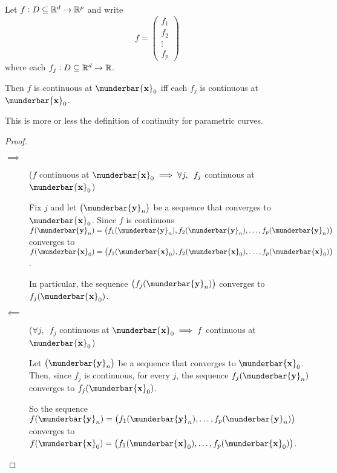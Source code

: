 \documentclass[14pt]{extarticle}
\renewcommand{\vec}[1]{\munderbar{\mathbf{#1}}}
\begin{document}
\begin{proposition}
    Let $f: D \subseteq \mathbb{R}^d \to \mathbb{R}^p$ and write
    \begin{equation}
        f = \begin{pmatrix}
            f_1    \\
            f_2    \\
            \vdots \\
            f_p
        \end{pmatrix}
    \end{equation}
    where each $f_j : D \subseteq \mathbb{R}^d \to \mathbb{R}$.

    Then $f$ is continuous at $\vec{x}_0$ iff each $f_j$ is continuous at $\vec{x}_0$.
\end{proposition}

\begin{remark}
    This is more or less the definition of continuity for parametric curves.
\end{remark}

\begin{proof}
    \skiplineafterproof
    \begin{description}
        \item[$\implies$] ($f$ continuous at $\vec{x}_0 \implies \forall j, \enspace f_j$ continuous at $\vec{x}_0$)

            Fix $j$ and let $\left(\vec{y}_n\right)$ be a sequence that converges to $\vec{x}_0$.
            Since $f$ is continuous $f(\vec{y}_n) = \left(f_1(\vec{y}_n), f_2(\vec{y}_n), \ldots, f_p(\vec{y}_n)\right)$ converges to $f(\vec{x}_0) = \left(f_1(\vec{x}_0), f_2(\vec{x}_0), \ldots, f_p(\vec{x}_0)\right)$.

            In particular, the sequence $\left(f_j(\vec{y}_n)\right)$ converges to $f_j(\vec{x}_0)$.

        \item[$\impliedby$] ($\forall j, \enspace f_j$ continuous at $\vec{x}_0 \implies f$ continuous at $\vec{x}_0$)

            Let $\left(\vec{y}_n\right)$ be a sequence that converges to $\vec{x}_0$. Then, since $f_j$ is continuous, for every $j$, the sequence $f_j(\vec{y}_n)$ converges to $f_j(\vec{x}_0)$.

            So the sequence $f(\vec{y}_n) = \left(f_1(\vec{y}_n), \ldots, f_p(\vec{y}_n)\right)$ converges to $f(\vec{x}_0) = \left(f_1(\vec{x}_0), \ldots, f_p(\vec{x}_0)\right)$.
    \end{description}
\end{proof}
\end{document}

